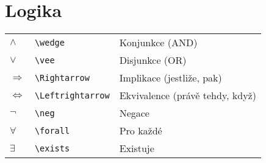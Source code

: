 \documentclass[main.tex]{subfiles}
\begin{document}
\section*{Logika}
\begin{tabular}{ p{2em} p{7.5em} l }
  $\wedge$					&	\verb|\wedge|		&	Konjunkce (AND)													\\
  $\vee$						&	\verb|\vee|			&	Disjunkce (OR)													\\
  $\Rightarrow$			&	\verb|\Rightarrow|	&	Implikace (jestliže, pak)						\\
  $\Leftrightarrow$	&	\verb|\Leftrightarrow|	&	Ekvivalence (právě tehdy, když)	\\
  $\neg$						&	\verb|\neg|			&	Negace																	\\
  $\forall$					&	\verb|\forall|		&	Pro každé															\\
  $\exists$					&	\verb|\exists|		&	Existuje
\end{tabular}
\end{document}
